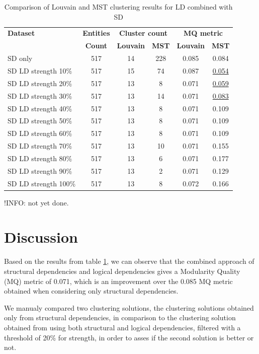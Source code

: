 \documentclass[conference]{IEEEtran}
\begin{document}
\begin{table}[htbp]
  \centering
  \caption{Comparison of Louvain and MST clustering results for LD combined with SD}
  \label{tab:clustering-results2}
  \begin{tabular}{lc|cc|cc}
    \toprule
    \textbf{Dataset} & \textbf{Entities} & \multicolumn{2}{c}{\textbf{Cluster count}} & \multicolumn{2}{c}{\textbf{MQ metric}} \\
    & \textbf{Count} & \textbf{Louvain} & \textbf{MST} & \textbf{Louvain} & \textbf{MST} \\
    \midrule
    SD only & 517 & 14 & 228 & 0.085 & 0.084 \\
    SD  LD strength 10\% & 517 & 15 & 74 & 0.087 & \underline{0.054} \\
    SD  LD strength 20\% & 517 & 13 & 8 & 0.071 & \underline{0.059} \\
    SD  LD strength 30\% & 517 & 13 & 14 & 0.071 & \underline{0.083} \\
    SD  LD strength 40\% & 517 & 13 & 8 & 0.071 & 0.109 \\
    SD  LD strength 50\% & 517 & 13 & 8 & 0.071 & 0.109 \\
    SD  LD strength 60\% & 517 & 13 & 8 & 0.071 & 0.109 \\
    SD  LD strength 70\% & 517 & 13 & 10 & 0.071 & 0.155 \\
    SD  LD strength 80\% & 517 & 13 & 6 & 0.071 & 0.177 \\
    SD  LD strength 90\% & 517 & 13 & 2 & 0.071 & 0.129 \\
    SD  LD strength 100\% & 517 & 13 & 8 & 0.072 & 0.166 \\
    \bottomrule
  \end{tabular}
\end{table}


!INFO: not yet done.



\section{Discussion}
\label{discussion}

Based on the results from table \ref{tab:clustering-results2}, we can observe that the combined approach of structural dependencies and logical dependencies gives a Modularity Quality (MQ) metric of 0.071, which is an improvement over the 0.085 MQ metric obtained when considering only structural dependencies. 

We manualy compared two clustering solutions, the clustering solutions obtained only from structural dependencies, in comparison to the clustering solution obtained from using both structural and logical dependencies, filtered with a threshold of 20\% for strength, in order to asses if the second solution is better or not.
\end{document}
